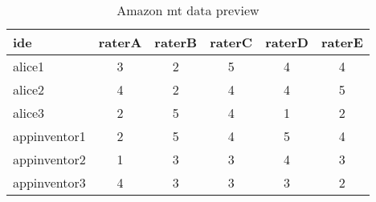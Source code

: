 \noindent
\begin{table}[!htb]\centering
{}
\label{table:mturk_data}
\begin{tabular}{@{}lccccc@{}}\toprule
  \textbf{\acs{ide}} & \textbf{raterA} & \textbf{raterB} &
  \textbf{raterC} & \textbf{raterD} & \textbf{raterE} \\
  \midrule
  alice1 & 3 & 2 & 5 & 4 & 4 \\
  alice2 & 4 & 2 & 4 & 4 & 5 \\
  alice3 & 2 & 5 & 4 & 1 & 2 \\
  appinventor1 & 2 & 5 & 4 & 5 & 4 \\
  appinventor2 & 1 & 3 & 3 & 4 & 3 \\
  appinventor3 & 4 & 3 & 3 & 3 & 2 \\
  \bottomrule
\end{tabular}
\caption{Amazon \acs{mt} data preview}
\end{table}
